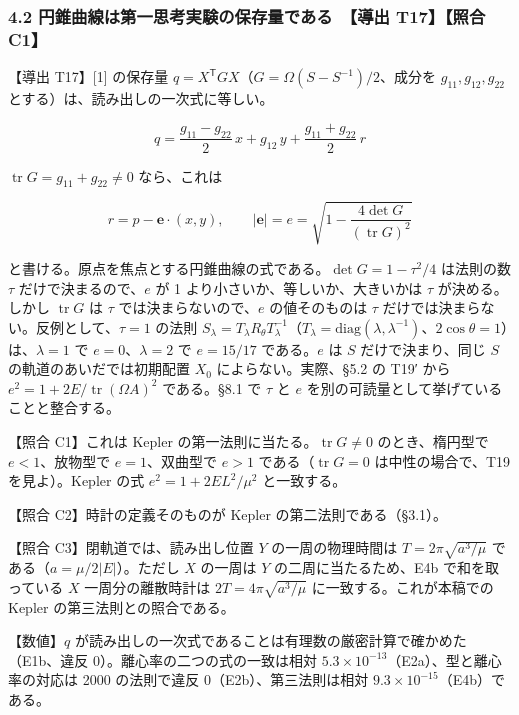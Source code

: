 \documentclass[
  a4paper,
]{ltjsarticle}
\begin{document}
\subsubsection{4.2 円錐曲線は第一思考実験の保存量である　【導出
T17】【照合
C1】}\label{ux5186ux9310ux66f2ux7ddaux306fux7b2cux4e00ux601dux8003ux5b9fux9a13ux306eux4fddux5b58ux91cfux3067ux3042ux308b-ux5c0eux51fa-t17ux7167ux5408-c1}

【導出 T17】{[}1{]} の保存量
\(q=X^{\mathsf T}GX\)（\(G=\Omega(S-S^{-1})/2\)、成分を
\(g_{11},g_{12},g_{22}\) とする）は、読み出しの一次式に等しい。

\[
\boxed{\;q=\frac{g_{11}-g_{22}}{2}\,x+g_{12}\,y+\frac{g_{11}+g_{22}}{2}\,r\;}
\]

\(\operatorname{tr}G=g_{11}+g_{22}\neq0\) なら、これは

\[
r=p-\mathbf e\cdot(x,y),\qquad \lvert\mathbf e\rvert=e=\sqrt{1-\frac{4\det G}{(\operatorname{tr}G)^2}}
\]

と書ける。原点を焦点とする円錐曲線の式である。\(\det G=1-\tau^2/4\)
は法則の数 \(\tau\) だけで決まるので、\(e\) が 1
より小さいか、等しいか、大きいかは \(\tau\) が決める。しかし
\(\operatorname{tr}G\) は \(\tau\) では決まらないので、\(e\)
の値そのものは \(\tau\) だけでは決まらない。反例として、\(\tau=1\)
の法則
\(S_\lambda=T_\lambda R_\theta T_\lambda^{-1}\)（\(T_\lambda=\mathrm{diag}(\lambda,\lambda^{-1})\)、\(2\cos\theta=1\)）は、\(\lambda=1\)
で \(e=0\)、\(\lambda=2\) で \(e=15/17\) である。\(e\) は \(S\)
だけで決まり、同じ \(S\) の軌道のあいだでは初期配置 \(X_0\)
によらない。実際、§5.2 の T19′ から
\(e^2=1+2E/\operatorname{tr}(\Omega A)^2\) である。§8.1 で \(\tau\) と
\(e\) を別の可読量として挙げていることと整合する。

【照合 C1】これは Kepler の第一法則に当たる。\(\operatorname{tr}G\neq0\)
のとき、楕円型で \(e<1\)、放物型で \(e=1\)、双曲型で \(e>1\)
である（\(\operatorname{tr}G=0\) は中性の場合で、T19 を見よ）。Kepler
の式 \(e^2=1+2EL^2/\mu^2\) と一致する。

【照合 C2】時計の定義そのものが Kepler の第二法則である（§3.1）。

【照合 C3】閉軌道では、読み出し位置 \(Y\) の一周の物理時間は
\(T=2\pi\sqrt{a^3/\mu}\) である（\(a=\mu/2\lvert E\rvert\)）。ただし
\(X\) の一周は \(Y\) の二周に当たるため、E4b で和を取っている \(X\)
一周分の離散時計は \(2T=4\pi\sqrt{a^3/\mu}\) に一致する。これが本稿での
Kepler の第三法則との照合である。

【数値】\(q\)
が読み出しの一次式であることは有理数の厳密計算で確かめた（E1b、違反
0）。離心率の二つの式の一致は相対
\(5.3\times10^{-13}\)（E2a）、型と離心率の対応は 2000 の法則で違反
0（E2b）、第三法則は相対 \(9.3\times10^{-15}\)（E4b）である。
\end{document}
